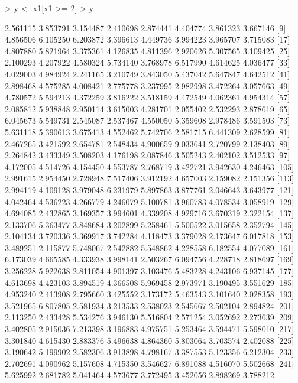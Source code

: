 \documentclass[12pt]{article}
\begin{document}
\begin{Schunk}
\begin{Soutput}
\end{Soutput}
\begin{Sinput}
> y <- x1[x1 >= 2] 
> y
\end{Sinput}
\begin{Soutput}
  [1] 2.561115 3.853791 3.154487 2.410698 2.874441 4.404774 3.861323 3.667146
  [9] 4.856506 6.105250 6.203872 3.396613 4.449736 3.994223 3.965707 3.715083
 [17] 4.807880 5.821964 3.375361 4.126835 4.811396 2.920626 5.307565 3.109425
 [25] 2.100293 4.207922 4.580324 5.734140 3.768978 6.517990 4.614625 4.036477
 [33] 4.029003 4.984924 2.241165 3.210749 3.843050 5.437042 5.647847 4.642512
 [41] 2.898468 4.575285 4.008421 2.775778 3.237995 2.982998 3.472264 3.057663
 [49] 4.780572 5.594213 4.372259 3.816222 3.518159 4.472549 4.062361 4.954314
 [57] 2.085812 5.938848 2.950114 3.615003 4.281701 2.055402 2.532293 2.878619
 [65] 6.045673 5.549731 2.545087 2.537467 4.550050 5.359608 2.978486 3.591503
 [73] 5.631118 5.390613 3.675413 4.552462 5.742706 2.581715 6.441309 2.628599
 [81] 2.467265 3.421592 2.654781 2.548434 4.900659 9.033641 2.720799 2.138403
 [89] 2.264842 3.433349 3.508203 4.176198 2.087846 3.505243 2.402102 3.512533
 [97] 4.172005 4.514726 4.154450 4.553787 2.768719 3.422721 3.942630 4.246463
[105] 2.991615 2.954450 2.728948 7.517406 3.912192 4.657003 2.159082 2.151356
[113] 2.994119 4.109128 3.979048 6.231979 5.897863 3.877761 2.046643 3.643977
[121] 4.042464 4.536223 4.266779 4.246079 5.100781 3.960783 4.078534 3.058919
[129] 4.694085 2.432865 3.169357 3.994601 4.339208 4.929716 3.670319 2.322154
[137] 2.133706 5.363477 3.848684 3.202899 5.258461 5.500522 3.015658 2.352794
[145] 2.104134 3.720336 3.369917 3.742284 4.118473 3.379028 2.173647 6.017818
[153] 3.489251 2.115877 5.748067 2.542882 5.548862 4.228558 6.182554 4.077089
[161] 6.173039 4.665585 4.333938 3.998141 2.503267 6.094756 4.228718 2.818697
[169] 3.256228 5.922638 2.811054 4.901397 3.103476 5.483228 4.243106 6.937145
[177] 4.613698 4.423103 3.894519 4.366508 5.969458 2.973971 3.190495 3.551629
[185] 4.953240 2.413908 2.795660 3.425552 3.173172 5.463543 3.101640 2.028358
[193] 3.521965 6.807805 2.581934 3.213533 2.538023 2.545667 2.502104 2.894824
[201] 2.113250 2.433428 5.534276 3.946130 5.516804 2.571254 3.052692 2.273639
[209] 3.402805 2.915036 7.213398 3.196883 4.975751 5.253464 3.594471 5.598010
[217] 3.301840 4.615430 2.883376 5.496638 4.864360 5.803064 3.703574 2.402088
[225] 3.190642 5.199902 2.582306 3.913898 4.798167 3.387553 5.123356 6.212304
[233] 2.702691 4.090962 5.157608 4.715350 3.546627 6.891088 4.516070 5.502668
[241] 5.625992 2.681782 5.041464 4.573677 3.772495 3.452056 2.898269 3.788212

\end{Soutput}
\end{Schunk}
\end{document}
